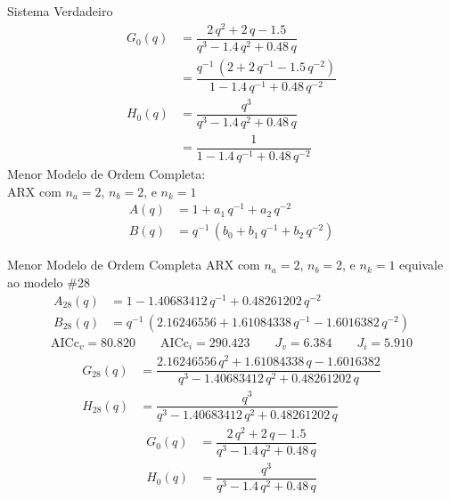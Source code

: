 \documentclass{beamer}
\newcommand{\Prod}{\,}
\renewcommand{\Prod}{\,}
\begin{document}
\begin{frame}{Sistema Verdadeiro}
  \begin{align}
    G_0(q) &= \dfrac{                   \num{2} \Prod q^2 + \num{2} \Prod q      - \num{1.5}                    }{q^3 - \num{1.4} \Prod q^2    + \num{0.48} \Prod q     }
    \\
           &= \dfrac{q^{-1} \Prod \left(\num{2}           + \num{2} \Prod q^{-1} - \num{1.5} \Prod q^{-2}\right)}{1   - \num{1.4} \Prod q^{-1} + \num{0.48} \Prod q^{-2}}
    \\
    H_0(q) &= \dfrac{q^3}{q^3 - \num{1.4} \Prod q^2    + \num{0.48} \Prod q     }
    \\
           &= \dfrac{1  }{1   - \num{1.4} \Prod q^{-1} + \num{0.48} \Prod q^{-2}}
  \end{align}
  \pause
  Menor Modelo de Ordem Completa:\\
  ARX com $n_a=2$, $n_b=2$, e $n_k=1$
  \begin{align}
    A(q) &= 1 + a_1 \Prod q^{-1} + a_2 \Prod q^{-2}
    \\
    B(q) &= q^{-1} \Prod \left(b_0 + b_1 \Prod q^{-1} + b_2 \Prod q^{-2}\right)
  \end{align}
\end{frame}

\begin{frame}{Menor Modelo de Ordem Completa}
  ARX com $n_a=2$, $n_b=2$, e $n_k=1$ equivale ao modelo \#28
  \begin{align}
    A_{28}(q) &= 1   - \num{1.40683412} \Prod q^{-1} + \num{0.48261202} \Prod q^{-2}
    \\
    B_{28}(q) &= q^{-1} \Prod \left(\num{2.16246556} + \num{1.61084338} \Prod q^{-1} - \num{1.6016382} \Prod q^{-2}\right)
  \end{align}
  \begin{gather}
    \text{AICc}_v = \num{80.820}
    \qquad
    \text{AICc}_i = \num{290.423}
    \qquad
    J_v = \num{6.384}
    \qquad
    J_i = \num{5.910}
  \end{gather}
  \vspace{-20pt}
  \begin{align}
    G_{28}(q) &= \dfrac{                   \num{2.16246556} \Prod q^2 + \num{1.61084338} \Prod q      - \num{1.6016382}                    }{q^3 - \num{1.40683412} \Prod q^2    + \num{0.48261202} \Prod q     }
    \\
    H_{28}(q) &= \dfrac{q^3}{q^3 - \num{1.40683412} \Prod q^2    + \num{0.48261202} \Prod q     }
  \end{align}
  \pause
  \vspace{-15pt}
  \begin{align}
    G_0(q) &= \dfrac{                   \num{2} \Prod q^2 + \num{2} \Prod q      - \num{1.5}                    }{q^3 - \num{1.4} \Prod q^2    + \num{0.48} \Prod q     }
    \\
    H_0(q) &= \dfrac{q^3}{q^3 - \num{1.4} \Prod q^2    + \num{0.48} \Prod q     }
  \end{align}
\end{frame}
\end{document}
